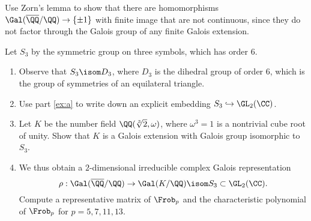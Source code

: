 {\begin{exercise}
  \begin{hint}
    Use Zorn's lemma to show that there are homomorphisms
    $\Gal(\overline{\QQ}/\QQ)\to\{\pm 1\}$ with finite image that are not continuous,
    since they do not factor through the Galois group of any
    finite Galois extension.
  \end{hint}

\end{exercise}

\begin{exercise}
  Let $S_3$ by the symmetric group on three symbols, which has order $6$.
  \begin{enumerate}[label=(\alph*)]
    \item \label{ex:a} Observe that $S_3\isom D_3$, where $D_3$ is
          the dihedral group of order $6$, which is the group of symmetries of
          an equilateral triangle.
    \item Use part \ref{ex:a} to write down an explicit
          embedding $S_3 \hookrightarrow \GL_2(\CC)$.
    \item Let $K$ be the number field $\QQ(\sqrt[3]{2},\omega)$,
          where $\omega^3=1$ is a nontrivial cube root of unity.  Show
          that $K$ is a Galois extension with Galois group isomorphic to~$S_3$.
    \item We thus obtain a $2$-dimensional irreducible complex
          Galois representation
          \[
            \rho:\Gal(\overline{\QQ}/\QQ) \to \Gal(K/\QQ) \isom S_3 \subset \GL_2(\CC).
          \]
          Compute a representative matrix of $\Frob_p$ and the characteristic polynomial
          of $\Frob_p$ for $p=5,7,11,13$.
  \end{enumerate}
\end{exercise}

}
